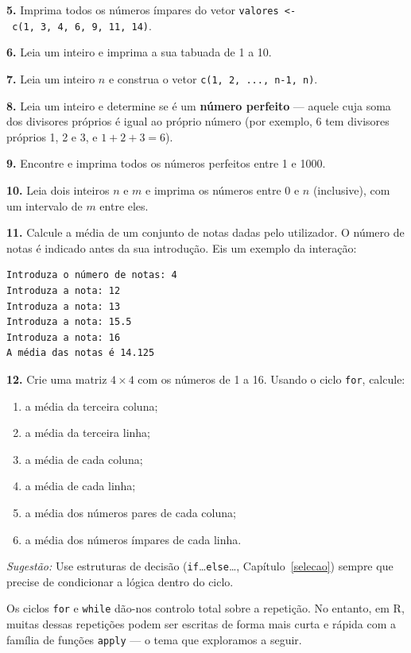 \documentclass[
  portuguese,
  11pt,
  openany]{book}
\providecommand{\tightlist}{%
  \setlength{\itemsep}{0pt}\setlength{\parskip}{0pt}}
\begin{document}
\textbf{5.} Imprima todos os números ímpares do vetor
\texttt{valores\ \textless{}-\ c(1,\ 3,\ 4,\ 6,\ 9,\ 11,\ 14)}.

\textbf{6.} Leia um inteiro e imprima a sua tabuada de 1 a 10.

\textbf{7.} Leia um inteiro \(n\) e construa o vetor \texttt{c(1,\ 2,\ ...,\ n-1,\ n)}.

\textbf{8.} Leia um inteiro e determine se é um \textbf{número perfeito} --- aquele cuja soma dos
divisores próprios é igual ao próprio número (por exemplo, 6 tem divisores próprios
1, 2 e 3, e \(1 + 2 + 3 = 6\)).

\textbf{9.} Encontre e imprima todos os números perfeitos entre 1 e 1000.

\textbf{10.} Leia dois inteiros \(n\) e \(m\) e imprima os números entre 0 e \(n\)
(inclusive), com um intervalo de \(m\) entre eles.

\textbf{11.} Calcule a média de um conjunto de notas dadas pelo utilizador. O número de
notas é indicado antes da sua introdução. Eis um exemplo da interação:

\begin{verbatim}
Introduza o número de notas: 4
Introduza a nota: 12
Introduza a nota: 13
Introduza a nota: 15.5
Introduza a nota: 16
A média das notas é 14.125
\end{verbatim}

\textbf{12.} Crie uma matriz \(4 \times 4\) com os números de 1 a 16. Usando o ciclo \texttt{for},
calcule:

\begin{enumerate}
\def\labelenumi{(\alph{enumi})}
\tightlist
\item
  a média da terceira coluna;
\item
  a média da terceira linha;
\item
  a média de cada coluna;
\item
  a média de cada linha;
\item
  a média dos números pares de cada coluna;
\item
  a média dos números ímpares de cada linha.
\end{enumerate}

\emph{Sugestão:} Use estruturas de decisão (\texttt{if}\ldots{}\texttt{else}\ldots, Capítulo~\ref{selecao}) sempre
que precise de condicionar a lógica dentro do ciclo.

Os ciclos \texttt{for} e \texttt{while} dão-nos controlo total sobre a repetição. No entanto, em R,
muitas dessas repetições podem ser escritas de forma mais curta e rápida com a família
de funções \texttt{apply} --- o tema que exploramos a seguir.
\end{document}
